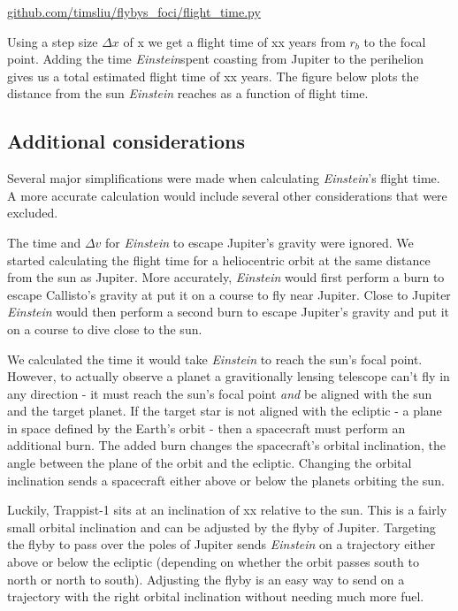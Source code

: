 \documentclass[12pt]{article} %
\begin{document}
\url{github.com/timsliu/flybys_foci/flight_time.py}

Using a step size $\Delta x$ of x we get a flight time of xx years from $r_b$ to the focal point. Adding the time \textit{Einstein}spent coasting from Jupiter to the perihelion gives us a total estimated flight time of xx years. The figure below plots the distance from the sun \textit{Einstein} reaches as a function of flight time.

\subsection{Additional considerations}
Several major simplifications were made when calculating \textit{Einstein}'s flight time. A more accurate calculation would include several other considerations that were excluded.

The time and $\Delta v$ for \textit{Einstein} to escape Jupiter's gravity were ignored. We started calculating the flight time for a heliocentric orbit at the same distance from the sun as Jupiter. More accurately, \textit{Einstein} would first perform a burn to escape Callisto's gravity at put it on a course to fly near Jupiter. Close to Jupiter \textit{Einstein} would then perform a second burn to escape Jupiter's gravity and put it on a course to dive close to the sun.

We calculated the time it would take \textit{Einstein} to reach the sun's focal point. However, to actually observe a planet a gravitionally lensing telescope can't fly in any direction - it must reach the sun's focal point \textit{and} be aligned with the sun and the target planet. If the target star is not aligned with the ecliptic - a plane in space defined by the Earth's orbit - then a spacecraft must perform an additional burn. The added burn changes the spacecraft's orbital inclination, the angle between the plane of the orbit and the ecliptic. Changing the orbital inclination sends a spacecraft either above or below the planets orbiting the sun.

Luckily, Trappist-1 sits at an inclination of xx relative to the sun. This is a fairly small orbital inclination and can be adjusted by the flyby of Jupiter. Targeting the flyby to pass over the poles of Jupiter sends \textit{Einstein} on a trajectory either above or below the ecliptic (depending on whether the orbit passes south to north or north to south). Adjusting the flyby is an easy way to send  on a trajectory with the right orbital inclination without needing much more fuel.
\end{document}

